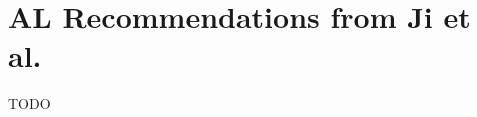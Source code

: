 \documentclass[]{article}
\newcommand{\R}{\mathbb{R}}
\newcommand{\EE}{\mathbb{E}}
\newcommand{\N}{\mathbb{N}}
\newcommand{\D}{\mathcal{D}}
\newcommand{\X}{\mathcal{X}}
\newcommand{\Y}{\mathcal{Y}}
\newcommand{\test}{\text{test}}
\newcommand{\train}{\text{train}}
\begin{document}



\section{AL Recommendations from Ji et al.}\label{app:recommendations}
TODO
\end{document}
